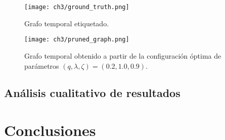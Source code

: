 \documentclass[letterpaper,12pt,oneside]{book} %
\begin{document}

\begin{figure}
    \centering
    \texttt{[image: ch3/ground\_truth.png]}
    \caption{Grafo temporal etiquetado.}
    \label{img:ground_truth}
\end{figure}

\begin{figure}
    \centering
    \texttt{[image: ch3/pruned\_graph.png]}
    \caption{Grafo temporal obtenido a partir de la configuración óptima de parámetros $(q, \lambda, \zeta) = (0.2, 1.0, 0.9)$.}
    \label{img:pruned_graph}
\end{figure}
\section{Análisis cualitativo de resultados}


\chapter{Conclusiones}




\end{document}
